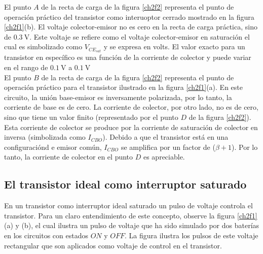 \documentclass{article}
\begin{document}
\newpage

El punto $A$ de la recta de carga de la figura \ref{ch2f2} representa el punto de operación práctico del transistor como interuoptor cerrado mostrado en la figura \ref{ch2f1}(b). El voltaje colector-emisor no es cero en la recta de carga práctica, sino de $\qty{0.3}{\volt}$. Este voltaje se refiere como el voltaje colector-emisor en saturación el cual es simbolizado como $V_{CE_{sat}}$ y se expresa en volts.
El valor exacto para un transistor en específico es una función de la corriente de colector y puede variar en el rango de $\qty{0.1}{\volt}$ a $\qty{0.1}{\volt}$ \\

El punto $B$ de la recta de carga de la figura \ref{ch2f2} representa el punto de operación práctico para el transistor ilustrado en la figura \ref{ch2f1}(a). En este circuito, la unión base-emisor es inversamente polarizada, por lo tanto, la corriente de base es de cero. La corriente de colector, por otro lado, no es de cero, sino que tiene un valor finito (representado por el punto $D$ de la figura \ref{ch2f2}). Esta corriente de colector se produce por la corriente de saturación de colector en inversa (simbolizada como $I_{CBO}$). Debido a que el transistor está en una configuraciónd e emisor común, $I_{CBO}$ se amplifica por un factor de ($\beta + 1$). Por lo tanto, la corriente de colector en el punto $D$ es apreciable.

\subsection{El transistor ideal como interruptor saturado}
En un transistor como interruptor ideal saturado un pulso de voltaje controla el transistor. Para un claro entendimiento de este concepto, observe la figura \ref{ch2f1}(a) y (b), el cual ilustra un pulso de voltaje que ha sido simulado por dos baterías en los circuitos con estados $ON$ y $OFF$. La figura ilustra los pulsos de este voltaje rectangular que son aplicados como voltaje de control en el transistor. 
\end{document}
